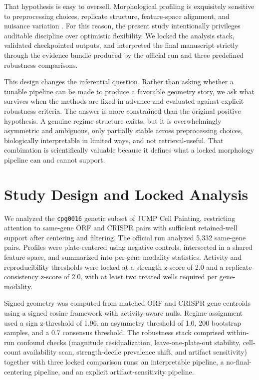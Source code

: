\documentclass[11pt]{article}
\begin{document}
That hypothesis is easy to oversell. Morphological profiling is exquisitely sensitive to preprocessing choices, replicate structure, feature-space alignment, and nuisance variation \cite{chandrasekaran2021upgrade, way2022complementary}. For this reason, the present study intentionally privileges auditable discipline over optimistic flexibility. We locked the analysis stack, validated checkpointed outputs, and interpreted the final manuscript strictly through the evidence bundle produced by the official run and three predefined robustness comparisons.

This design changes the inferential question. Rather than asking whether a tunable pipeline can be made to produce a favorable geometry story, we ask what survives when the methods are fixed in advance and evaluated against explicit robustness criteria. The answer is more constrained than the original positive hypothesis. A genuine regime structure exists, but it is overwhelmingly asymmetric and ambiguous, only partially stable across preprocessing choices, biologically interpretable in limited ways, and not retrieval-useful. That combination is scientifically valuable because it defines what a locked morphology pipeline can and cannot support.

\section{Study Design and Locked Analysis}
We analyzed the \texttt{cpg0016} genetic subset of JUMP Cell Painting, restricting attention to same-gene ORF and CRISPR pairs with sufficient retained-well support after centering and filtering. The official run analyzed 5,332 same-gene pairs. Profiles were plate-centered using negative controls, intersected in a shared feature space, and summarized into per-gene modality statistics. Activity and reproducibility thresholds were locked at a strength z-score of 2.0 and a replicate-consistency z-score of 2.0, with at least two treated wells required per gene-modality.

Signed geometry was computed from matched ORF and CRISPR gene centroids using a signed cosine framework with activity-aware nulls. Regime assignment used a sign z-threshold of 1.96, an asymmetry threshold of 1.0, 200 bootstrap samples, and a 0.7 consensus threshold. The robustness stack comprised within-run confound checks (magnitude residualization, leave-one-plate-out stability, cell-count availability scan, strength-decile prevalence shift, and artifact sensitivity) together with three locked comparison runs: an interpretable pipeline, a no-final-centering pipeline, and an explicit artifact-sensitivity pipeline.
\end{document}
